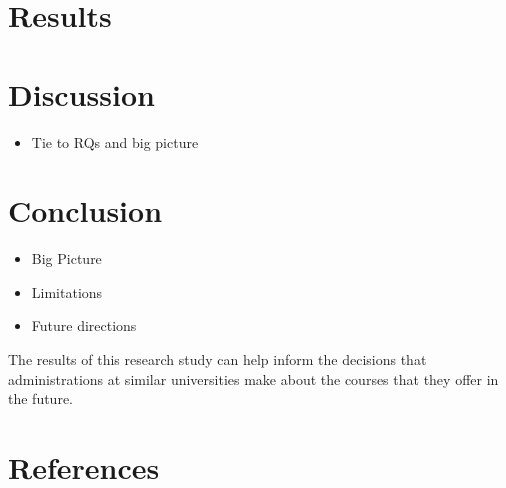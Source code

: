 \documentclass[
  man]{apa6}
\providecommand{\tightlist}{%
  \setlength{\itemsep}{0pt}\setlength{\parskip}{0pt}}
\begin{document}
\hypertarget{results}{%
\section{Results}\label{results}}

\hypertarget{discussion}{%
\section{Discussion}\label{discussion}}

\begin{itemize}
\tightlist
\item
  Tie to RQs and big picture
\end{itemize}

\hypertarget{conclusion}{%
\section{Conclusion}\label{conclusion}}

\begin{itemize}
\item
  Big Picture
\item
  Limitations
\item
  Future directions
\end{itemize}

The results of this research study can help inform the decisions that administrations at similar universities make about the courses that they offer in the future.

\newpage

\hypertarget{references}{%
\section{References}\label{references}}
\end{document}
